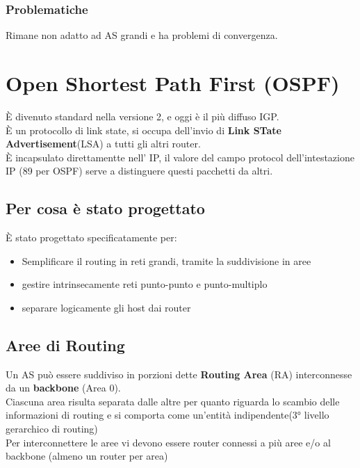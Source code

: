 \documentclass{report}
\begin{document}
                \subsubsection{Problematiche}
                    Rimane non adatto ad AS grandi e ha problemi di convergenza.
        \section{Open Shortest Path First (OSPF)}
            È divenuto standard nella versione 2, e oggi è il più diffuso IGP.
            \\
            È un protocollo di link state, si occupa dell'invio di \textbf{Link STate Advertisement}(LSA)
            a tutti gli altri router.
            \\
            È incapsulato direttamentte nell' IP, il valore del campo protocol dell'intestazione IP (89 per OSPF) serve a distinguere questi pacchetti da altri.
            \\
            \subsection{Per cosa è stato progettato}
                È stato progettato specificatamente per:
                \begin{itemize}
                    \item Semplificare il routing in reti grandi, tramite la suddivisione in aree
                    \item gestire intrinsecamente reti punto-punto e punto-multiplo
                    \item separare logicamente gli host dai router
                \end{itemize}
            \subsection{Aree di Routing}
                Un AS può essere suddiviso in porzioni dette \textbf{Routing Area} (RA) interconnesse da un \textbf{backbone} (Area 0).
                \\
                Ciascuna area risulta separata dalle altre per quanto riguarda lo scambio delle informazioni di routing e si comporta come un'entità indipendente(3° livello gerarchico di routing)
                \\
                Per interconnettere le aree vi devono essere router connessi a più aree e/o al backbone (almeno un router per area)
\end{document}
